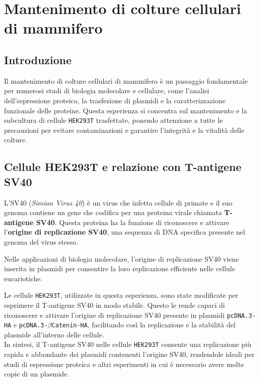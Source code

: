 \section {Mantenimento di colture cellulari di mammifero}

\subsection{Introduzione}
\normalsize
  Il mantenimento di colture cellulari di mammifero è un passaggio fondamentale per numerosi studi di biologia molecolare e cellulare, come l’analisi dell’espressione proteica, la trasfezione di plasmidi e la caratterizzazione funzionale delle proteine. Questa esperienza si concentra sul mantenimento e la subcultura di cellule \texttt{HEK293T} trasfettate, ponendo attenzione a tutte le precauzioni per evitare contaminazioni e garantire l’integrità e la vitalità delle colture.

\vspace{1em}
\subsection{Cellule HEK293T e relazione con T-antigene SV40}

L’SV40 (\textit{Simian Virus 40}) è un virus che infetta cellule di primate e il suo genoma contiene un gene che codifica per una proteina virale chiamata \textbf{T-antigene SV40}.  
Questa proteina ha la funzione di riconoscere e attivare l’\textbf{origine di replicazione SV40}, una sequenza di DNA specifica presente nel genoma del virus stesso.

Nelle applicazioni di biologia molecolare, l’origine di replicazione SV40 viene inserita in plasmidi per consentire la loro replicazione efficiente nelle cellule eucariotiche.  

Le cellule \texttt{HEK293T}, utilizzate in questa esperienza, sono state modificate per esprimere il T-antigene SV40 in modo stabile. Questo le rende capaci di riconoscere e attivare l’origine di replicazione SV40 presente in plasmidi \texttt{pcDNA.3-HA} e \texttt{pcDNA.3-$\beta$Catenin-HA}, facilitando così la replicazione e la stabilità del plasmide all’interno delle cellule.
\vspace{0.25em}\\
In sintesi, il T-antigene SV40 nelle cellule \texttt{HEK293T} consente una replicazione più rapida e abbondante dei plasmidi contenenti l’origine SV40, rendendole ideali per studi di espressione proteica e altri esperimenti in cui è necessario avere molte copie di un plasmide.

